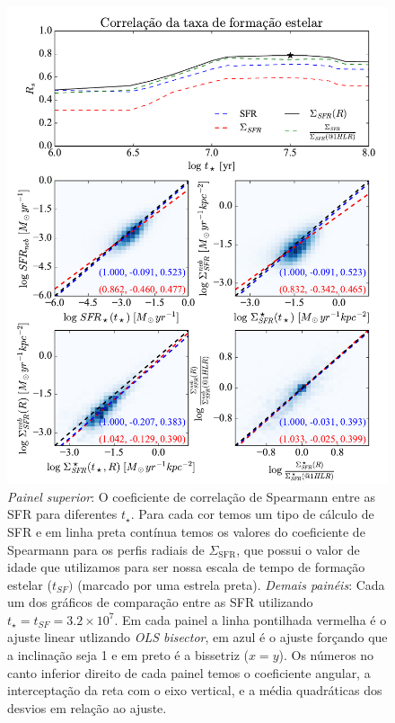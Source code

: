 \begin{figure}
	\centering
	\includegraphics[scale=0.7, clip]{figuras/Rs_allSFR.pdf}
	\caption[Comparação entre as SFR.]
	{\emph{Painel superior}: O coeficiente de correlação de Spearmann entre as SFR para diferentes
$t_\star$. Para cada cor temos um tipo de cálculo de SFR e em linha preta contínua temos os valores
do coeficiente de Spearmann para os perfis radiais de $\Sigma_{\mathrm{SFR}}$, que possui o valor de
idade que utilizamos para ser nossa escala de tempo de formação estelar ($t_{SF})$ (marcado
por uma estrela preta). \emph{Demais painéis}: Cada um dos gráficos de comparação entre as SFR
utilizando $t_\star = t_{SF} = 3.2 \times 10^7$. Em cada painel a linha pontilhada vermelha é o
ajuste linear utlizando {\em OLS bisector}, em azul é o ajuste forçando que a inclinação seja 1 e
em preto é a bissetriz ($x = y$). Os números no canto inferior direito de cada painel temos o
coeficiente angular, a interceptação da reta com o eixo vertical, e a média quadráticas dos desvios
em relação ao ajuste.}
	\label{fig:SFRsynvsneb}
\end{figure}

